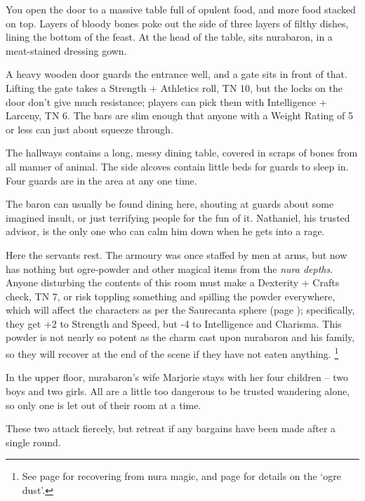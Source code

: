 \begin{multicols}{2}
\begin{boxtext}
  You open the door to a massive table full of opulent food, and more food stacked on top.  Layers of bloody bones poke out the side of three layers of filthy dishes, lining the bottom of the feast.  At the head of the table, sits \gls{nurabaron}, in a meat-stained dressing gown.

\end{boxtext}

A heavy wooden door guards the entrance well, and a gate sits in front of that.  Lifting the gate takes a Strength + Athletics roll, TN 10, but the locks on the door don't give much resistance; players can pick them with Intelligence + Larceny, TN 6.  The bars are slim enough that anyone with a Weight Rating of 5 or less can just about squeeze through.

The hallways contains a long, messy dining table, covered in scraps of bones from all manner of animal.  The side alcoves contain little beds for guards to sleep in.  Four guards are in the area at any one time.

The baron can usually be found dining here, shouting at guards about some imagined insult, or just terrifying people for the fun of it.  Nathaniel, his trusted advisor, is the only one who can calm him down when he gets into a rage.


Here the servants rest.
The armoury was once staffed by men at arms, but now has nothing but ogre-powder and other magical items from the \textit{nura depths}.
Anyone disturbing the contents of this room must make a Dexterity + Crafts check, TN 7, or risk toppling something and spilling the powder everywhere, which will affect the characters as per the Saurecanta sphere (page \pageref{saurecanta}); specifically, they get +2 to Strength and Speed, but -4 to Intelligence and Charisma.
This powder is not nearly so potent as the charm cast upon \gls{nurabaron} and his family, so they will recover at the end of the scene if they have not eaten anything.
\footnote{See page \pageref{nura_recovery} for recovering from nura magic, and page \pageref{ogredust} for details on the `ogre dust'.}


In the upper floor, \gls{nurabaron}'s wife Marjorie stays with her four children -- two boys and two girls.  All are a little too dangerous to be trusted wandering alone, so only one is let out of their room at a time.

These two attack fiercely, but retreat if any bargains have been made after a single round.


\end{multicols}

